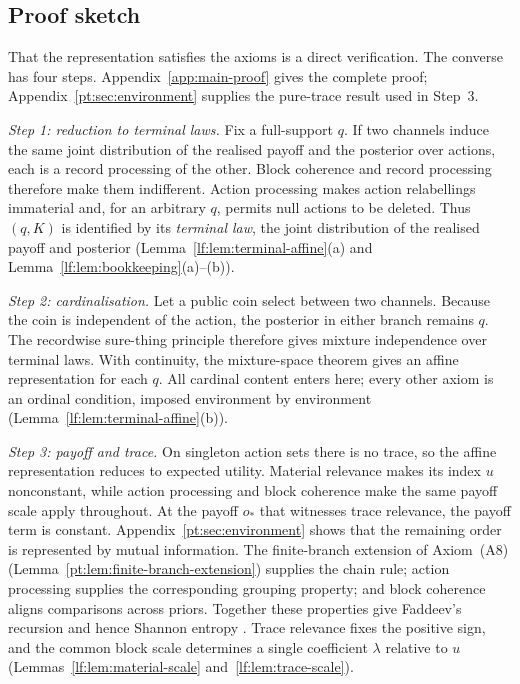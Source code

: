 \documentclass[11pt,a4paper]{article}
\theoremstyle{definition}
\newcommand{\1}{\mathbf 1}
\begin{document}
\subsection{Proof sketch}
That the representation satisfies the axioms is a direct verification.  The converse has four steps.
Appendix~\ref{app:main-proof} gives the complete proof; Appendix~\ref{pt:sec:environment} supplies the pure-trace
result used in Step~3.

\emph{Step 1: reduction to terminal laws.}  Fix a full-support $q$.  If two channels induce the same joint
distribution of the realised payoff and the posterior over actions, each is a record processing of the other.
Block coherence and record processing therefore make them indifferent.  Action processing makes action
relabellings immaterial and, for an arbitrary $q$, permits null actions to be deleted.  Thus $(q,K)$ is identified
by its \emph{terminal law}, the joint distribution of the realised payoff and posterior
(Lemma~\ref{lf:lem:terminal-affine}\textup{(a)} and
Lemma~\ref{lf:lem:bookkeeping}\textup{(a)--(b)}).

\emph{Step 2: cardinalisation.}  Let a public coin select between two channels.  Because the coin is independent
of the action, the posterior in either branch remains $q$.  The recordwise sure-thing principle therefore gives
mixture independence over terminal laws.  With continuity, the mixture-space theorem gives an affine
representation for each $q$.  All cardinal content enters here; every other axiom is an ordinal condition,
imposed environment by environment (Lemma~\ref{lf:lem:terminal-affine}\textup{(b)}).

\emph{Step 3: payoff and trace.}  On singleton action sets there is no trace, so the affine representation reduces
to expected utility.  Material relevance makes its index $u$ nonconstant, while action processing and block
coherence make the same payoff scale apply throughout.  At the payoff $o_\ast$ that witnesses trace relevance,
the payoff term is constant.  Appendix~\ref{pt:sec:environment} shows that the remaining order is represented by
mutual information.  The finite-branch extension of Axiom~\textup{(A8)} (Lemma~\ref{pt:lem:finite-branch-extension}) supplies the chain rule; action processing supplies the corresponding
grouping property; and block coherence aligns comparisons across priors.  Together these
properties give Faddeev's recursion and hence Shannon entropy \cite{Faddeev1956}.  Trace relevance fixes the
positive sign, and the common block scale determines a single coefficient $\lambda$ relative to $u$
(Lemmas~\ref{lf:lem:material-scale} and~\ref{lf:lem:trace-scale}).
\end{document}
